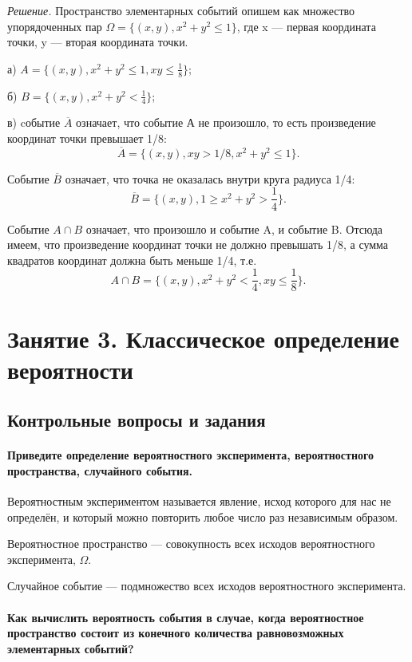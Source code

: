 \documentclass{book}
\begin{document}
\textit{Решение.} Пространство элементарных событий опишем как множество упорядоченных пар $\Omega=\{(x, y), x^2+y^2\leq 1\}$, где x --- первая координата точки, y --- вторая координата точки.

а) $A=\{(x, y), x^2+y^2\leq 1, xy\leq\frac{1}{8}\}$;

б) $B=\{(x, y), x^2+y^2<\frac{1}{4}\}$;

в) cобытие $\overline{A}$ означает, что событие А не произошло, то есть произведение координат точки превышает 1/8: $$\overline{A}=\{(x, y), xy>1/8, x^2+y^2\leq 1\}.$$

Событие $\overline{B}$ означает, что точка не оказалась внутри круга радиуса 1/4: $$\overline{B}=\{(x, y), 1\geq x^2+y^2>\frac{1}{4}\}.$$

Событие $A\cap B$ означает, что произошло и событие A, и событие B. Отсюда имеем, что произведение координат точки не должно превышать 1/8, а сумма квадратов координат должна быть меньше 1/4, т.е. $$A\cap B=\{(x, y), x^2+y^2<\frac{1}{4}, xy\leq\frac{1}{8}\}.$$

\chapter*{Занятие 3. Классическое определение вероятности}

\section*{Контрольные вопросы и задания}

\subsubsection*{Приведите определение вероятностного эксперимента, вероятностного пространства, случайного события.}

Вероятностным экспериментом называется явление, исход которого для нас не определён, и который можно повторить любое число раз независимым образом.

Вероятностное пространство --- совокупность всех исходов вероятностного эксперимента, $\Omega$.

Случайное событие --- подмножество всех исходов вероятностного эксперимента.

\subsubsection*{Как вычислить вероятность события в случае, когда вероятностное пространство состоит из конечного количества равновозможных элементарных событий?}
\end{document}
